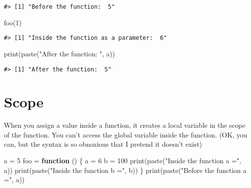 \documentclass[
]{book}
\newenvironment{Shaded}{\begin{snugshade}}{\end{snugshade}}
\newcommand{\ControlFlowTok}[1]{\textcolor[rgb]{0.13,0.29,0.53}{\textbf{#1}}}
\newcommand{\DecValTok}[1]{\textcolor[rgb]{0.00,0.00,0.81}{#1}}
\newcommand{\FunctionTok}[1]{\textcolor[rgb]{0.00,0.00,0.00}{#1}}
\newcommand{\NormalTok}[1]{#1}
\newcommand{\OtherTok}[1]{\textcolor[rgb]{0.56,0.35,0.01}{#1}}
\newcommand{\StringTok}[1]{\textcolor[rgb]{0.31,0.60,0.02}{#1}}
\begin{document}
\begin{verbatim}
#> [1] "Before the function:  5"
\end{verbatim}

\begin{Shaded}
\begin{Highlighting}[]
\FunctionTok{foo}\NormalTok{(}\DecValTok{1}\NormalTok{)}
\end{Highlighting}
\end{Shaded}

\begin{verbatim}
#> [1] "Inside the function as a parameter:  6"
\end{verbatim}

\begin{Shaded}
\begin{Highlighting}[]
\FunctionTok{print}\NormalTok{(}\FunctionTok{paste}\NormalTok{(}\StringTok{"After the function: "}\NormalTok{, a))}
\end{Highlighting}
\end{Shaded}

\begin{verbatim}
#> [1] "After the function:  5"
\end{verbatim}

\hypertarget{scope}{%
\section{Scope}\label{scope}}

When you assign a value inside a function, it creates a local variable in the scope of the function. You can't access the global variable inside the function. (OK, you can, but the syntax is so obnoxious that I pretend it doesn't exist)

\begin{Shaded}
\begin{Highlighting}[]
\NormalTok{a }\OtherTok{=} \DecValTok{5}
\NormalTok{foo }\OtherTok{=} \ControlFlowTok{function}\NormalTok{ () \{}
\NormalTok{  a }\OtherTok{=} \DecValTok{6}
\NormalTok{  b }\OtherTok{=} \DecValTok{100}
  \FunctionTok{print}\NormalTok{(}\FunctionTok{paste}\NormalTok{(}\StringTok{"Inside the function a ="}\NormalTok{, a))}
  \FunctionTok{print}\NormalTok{(}\FunctionTok{paste}\NormalTok{(}\StringTok{"Inside the function b ="}\NormalTok{, b))}
\NormalTok{\}}
\FunctionTok{print}\NormalTok{(}\FunctionTok{paste}\NormalTok{(}\StringTok{"Before the function a ="}\NormalTok{, a))}
\end{Highlighting}
\end{Shaded}
\end{document}
